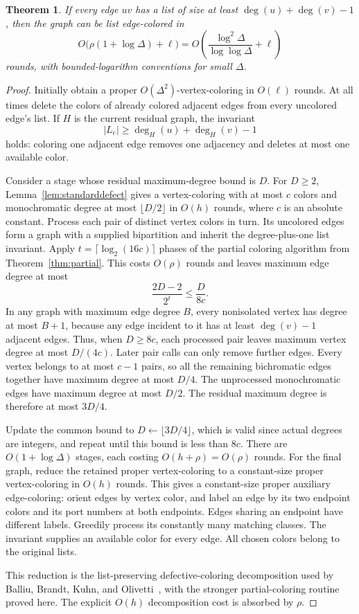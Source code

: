\documentclass[11pt]{article}
\newtheorem{theorem}{Theorem}[section]
\theoremstyle{definition}
\theoremstyle{remark}
\begin{document}
\begin{theorem}\label{thm:generaldegreeone}
If every edge $uv$ has a list of size at least
$\deg(u)+\deg(v)-1$, then the graph can be list edge-colored in
\[
 O\bigl(\rho(1+\log\Delta)+\ell\bigr)
 =O\left(\frac{\log^2\Delta}{\log\log\Delta}+\ell\right)
\]
rounds, with bounded-logarithm conventions for small $\Delta$.
\end{theorem}

\begin{proof}
Initially obtain a proper $O(\Delta^2)$-vertex-coloring in $O(\ell)$
rounds.  At all times delete the colors of already colored adjacent
edges from every uncolored edge's list.  If $H$ is the current residual
graph, the invariant
\[
 |L_e|\ge \deg_H(u)+\deg_H(v)-1
\]
holds: coloring one adjacent edge removes one adjacency and deletes at
most one available color.

Consider a stage whose residual maximum-degree bound is $D$.  For
$D\ge2$, Lemma~\ref{lem:standarddefect} gives a vertex-coloring with
at most $c$ colors and monochromatic degree at most $\lfloor D/2\rfloor$
in $O(h)$ rounds, where $c$ is an absolute constant.  Process each pair
of distinct vertex colors in turn.  Its uncolored edges form a graph
with a supplied bipartition and inherit the degree-plus-one list
invariant.  Apply $t=\lceil\log_2(16c)\rceil$ phases of the partial
coloring algorithm from Theorem~\ref{thm:partial}.  This costs $O(\rho)$
rounds and leaves maximum edge degree at most
\[
 \frac{2D-2}{2^t}\le\frac{D}{8c}.
\]
In any graph with maximum edge degree $B$, every nonisolated vertex has
degree at most $B+1$, because any edge incident to it has at least
$\deg(v)-1$ adjacent edges.  Thus, when $D\ge8c$, each processed
pair leaves maximum vertex degree at most $D/(4c)$.  Later pair calls
can only remove further edges.  Every vertex belongs to at most $c-1$
pairs, so all the remaining bichromatic edges together have maximum
degree at most $D/4$.  The unprocessed monochromatic edges have maximum
degree at most $D/2$.  The residual maximum degree is therefore at most
$3D/4$.

Update the common bound to $D\leftarrow\lfloor3D/4\rfloor$, which is valid since actual degrees are integers, and repeat until this bound is less than $8c$.  There are
$O(1+\log\Delta)$ stages, each costing $O(h+\rho)=O(\rho)$ rounds.
For the final graph, reduce the retained proper vertex-coloring to a
constant-size proper vertex-coloring in $O(h)$ rounds.  This gives a
constant-size proper auxiliary edge-coloring: orient edges by vertex
color, and label an edge by its two endpoint colors and its port
numbers at both endpoints.  Edges sharing an endpoint have
different labels.  Greedily process its constantly many matching
classes.  The invariant supplies an available color for every edge.
All chosen colors belong to the original lists.

This reduction is the list-preserving defective-coloring decomposition
used by Balliu, Brandt, Kuhn, and Olivetti~\cite[Theorem~D.4]{BBKO},
with the stronger partial-coloring routine proved here.  The explicit
$O(h)$ decomposition cost is absorbed by $\rho$.
\end{proof}
\end{document}

